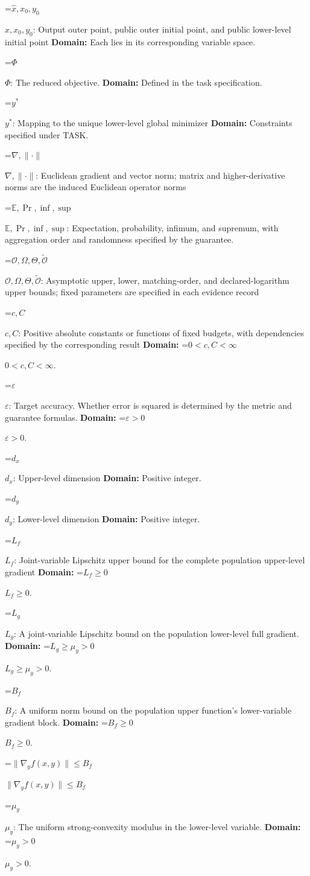 \documentclass[10pt,a4paper]{article}
\newcommand{\AtlasMath}[1]{\par\begingroup\centering\setbox0=\hbox{$\displaystyle #1$}\ifdim\wd0>1.4\linewidth\typeout{ATLAS WIDE FORMULA: \the\wd0}\fi\ifdim\wd0>\linewidth\resizebox{\linewidth}{!}{\box0}\else\box0\fi\par\endgroup}
\newcommand{\AtlasInlineMath}[1]{\begingroup\setbox0=\hbox{$#1$}\ifdim\wd0>.4\linewidth\endgroup\AtlasMath{#1}\else\endgroup$#1$\fi}
\begin{document}
\AtlasInlineMath{\widehat x,x_0,y_0}: Output outer point, public outer initial point, and public lower-level initial point \textbf{Domain:} Each lies in its corresponding variable space.

\AtlasInlineMath{\Phi}: The reduced objective. \textbf{Domain:} Defined in the task specification.

\AtlasInlineMath{y^*}: Mapping to the unique lower-level global minimizer \textbf{Domain:} Constraints specified under TASK.

\AtlasInlineMath{\nabla,\|\cdot\|}: Euclidean gradient and vector norm; matrix and higher-derivative norms are the induced Euclidean operator norms

\AtlasInlineMath{\mathbb E,\Pr,\inf,\sup}: Expectation, probability, infimum, and supremum, with aggregation order and randomness specified by the guarantee.

\AtlasInlineMath{\mathcal O,\Omega,\Theta,\widetilde{\mathcal O}}: Asymptotic upper, lower, matching-order, and declared-logarithm upper bounds; fixed parameters are specified in each evidence record

\AtlasInlineMath{c,C}: Positive absolute constants or functions of fixed budgets, with dependencies specified by the corresponding result \textbf{Domain:} \AtlasInlineMath{0<c,C<\infty}.

\AtlasInlineMath{\varepsilon}: Target accuracy. Whether error is squared is determined by the metric and guarantee formulas. \textbf{Domain:} \AtlasInlineMath{\varepsilon>0}.

\AtlasInlineMath{d_x}: Upper-level dimension \textbf{Domain:} Positive integer.

\AtlasInlineMath{d_y}: Lower-level dimension \textbf{Domain:} Positive integer.

\AtlasInlineMath{L_f}: Joint-variable Lipschitz upper bound for the complete population upper-level gradient \textbf{Domain:} \AtlasInlineMath{L_f\ge0}.

\AtlasInlineMath{L_g}: A joint-variable Lipschitz bound on the population lower-level full gradient. \textbf{Domain:} \AtlasInlineMath{L_g\ge\mu_y>0}.

\AtlasInlineMath{B_f}: A uniform norm bound on the population upper function’s lower-variable gradient block. \textbf{Domain:} \AtlasInlineMath{B_f\ge0}.

\AtlasInlineMath{\|\nabla_yf(x,y)\|\le B_f}

\AtlasInlineMath{\mu_y}: The uniform strong-convexity modulus in the lower-level variable. \textbf{Domain:} \AtlasInlineMath{\mu_y>0}.
\end{document}
